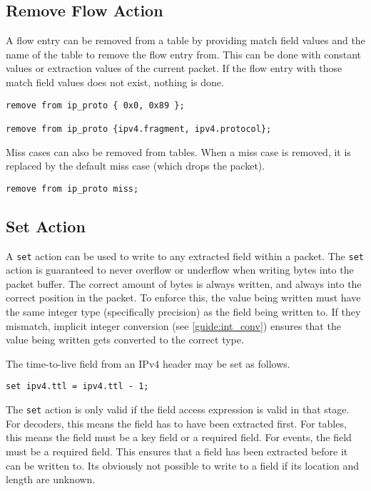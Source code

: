 \subsection{Remove Flow Action} \label{tut:remove_flow_action}

A flow entry can be removed from a table by providing match field values and the
name of the table to remove the flow entry from. This can be done with constant
values or extraction values of the current packet. If the flow entry with
those match field values does not exist, nothing is done.


\begin{lstlisting}
remove from ip_proto { 0x0, 0x89 };

remove from ip_proto {ipv4.fragment, ipv4.protocol};
\end{lstlisting}

Miss cases can also be removed from tables. When a miss case is removed, it is
replaced by the default miss case (which drops the packet).

\begin{lstlisting}
remove from ip_proto miss;
\end{lstlisting}

\subsection{Set Action} \label{tut:set_action}

A \texttt{set} action can be used to write to any extracted field within a
packet. 
The \texttt{set} action is guaranteed to never overflow or underflow when
writing bytes into the packet buffer.
The correct amount of bytes is always written, and always into the correct position in the packet.
To enforce this, the value being written must have the same integer type (specifically precision) as the field being written to. If they mismatch, implicit integer conversion (see \ref{guide:int_conv}) ensures that the value being written gets converted to the correct type.

The time-to-live field from an IPv4 header may be set as follows.

\begin{lstlisting}
set ipv4.ttl = ipv4.ttl - 1;
\end{lstlisting}

The \texttt{set} action is only valid if the field access expression is valid in
that stage. For decoders, this means the field has to have been extracted first.
For tables, this means the field must be a key field or a required field. For
events, the field must be a required field. This ensures that a field
has been extracted before it can be written to. Its obviously not possible
to write to a field if its location and length are unknown.

